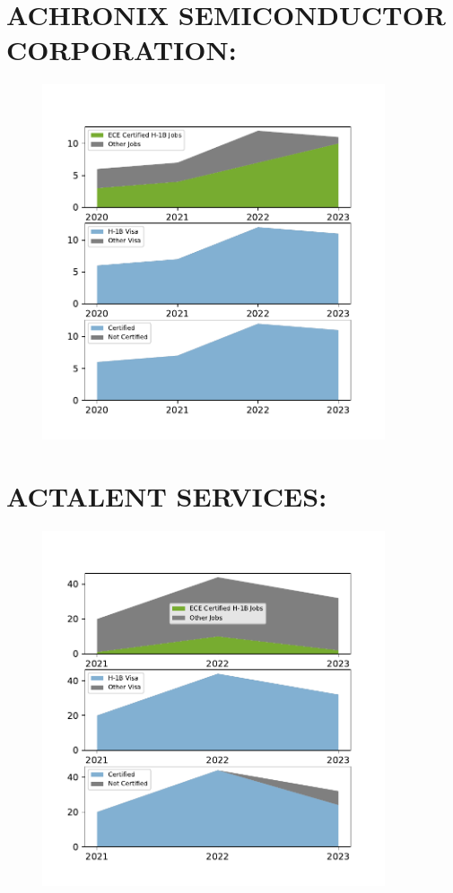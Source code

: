 \documentclass{article}%
\begin{document}
%
\section{ACHRONIX SEMICONDUCTOR CORPORATION:}%
\label{sec:ACHRONIXSEMICONDUCTORCORPORATION}%


\begin{figure}[h]%
\centering%
\includegraphics[width=0.9\textwidth]{./temp_img/ACHRONIXSEMICONDUCTORCORPORATION_detailed.pdf}%
\end{figure}

%
\section{ACTALENT SERVICES:}%
\label{sec:ACTALENTSERVICES}%


\begin{figure}[h]%
\centering%
\includegraphics[width=0.9\textwidth]{./temp_img/ACTALENTSERVICES_detailed.pdf}%
\end{figure}
\end{document}
